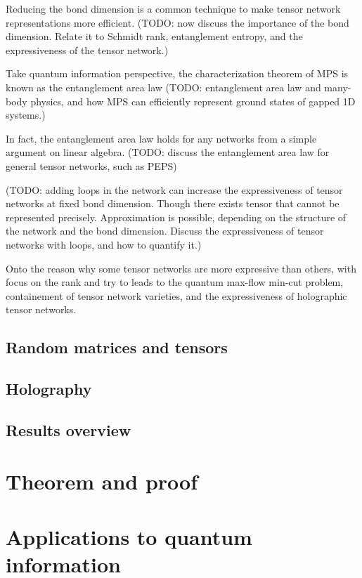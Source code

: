 \documentclass{article}
\begin{document}
Reducing the bond dimension is a common technique to make tensor network representations more efficient. (TODO: now discuss the importance of the bond dimension. Relate it to Schmidt rank, entanglement entropy, and the expressiveness of the tensor network.)

Take quantum information perspective, the characterization theorem of MPS is known as the entanglement area law (TODO: entanglement area law and many-body physics, and how MPS can efficiently represent ground states of gapped 1D systems.)

In fact, the entanglement area law holds for any networks from a simple argument on linear algebra. (TODO: discuss the entanglement area law for general tensor networks, such as PEPS)

(TODO: adding loops in the network can increase the expressiveness of tensor networks at fixed bond dimension. Though there exists tensor that cannot be represented precisely. Approximation is possible, depending on the structure of the network and the bond dimension. Discuss the expressiveness of tensor networks with loops, and how to quantify it.)

Onto the reason why some tensor networks are more expressive than others, with focus on the rank and try to leads to the quantum max-flow min-cut problem, containement of tensor network varieties, and the expressiveness of holographic tensor networks. 



\subsection{Random matrices and tensors}
\subsection{Holography}
\subsection{Results overview}

\section{Theorem and proof}

\section{Applications to quantum information}
\end{document}
